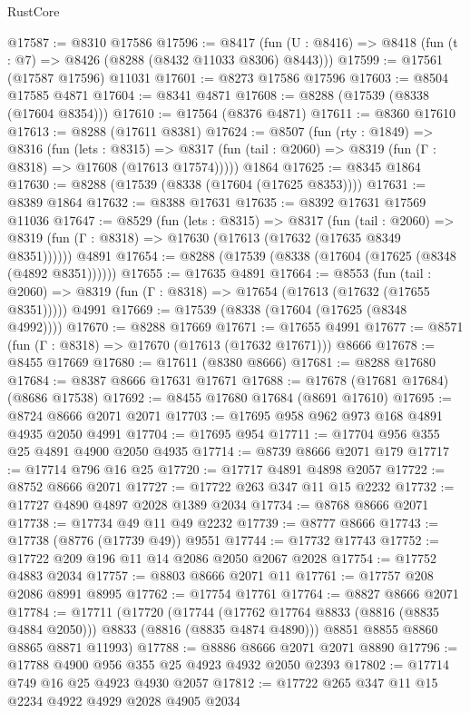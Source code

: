 \begin{lexlean}{RustCore}
\begin{coremodule}
@17587 := @8310 @17586
@17596 := @8417
    (fun (U : @8416) => @8418 (fun (t : @7) => @8426 (@8288 (@8432 @11033 @8306) @8443)))
@17599 := @17561 (@17587 @17596) @11031
@17601 := @8273 @17586 @17596
@17603 := @8504 @17585 @4871
@17604 := @8341 @4871
@17608 := @8288 (@17539 (@8338 (@17604 @8354)))
@17610 := @17564 (@8376 @4871)
@17611 := @8360 @17610
@17613 := @8288 (@17611 @8381)
@17624 := @8507
    (fun (rty : @1849) =>
    @8316
      (fun (lets : @8315) =>
      @8317 (fun (tail : @2060) => @8319 (fun (Γ : @8318) => @17608 (@17613 @17574)))))
    @1864
@17625 := @8345 @1864
@17630 := @8288 (@17539 (@8338 (@17604 (@17625 @8353))))
@17631 := @8389 @1864
@17632 := @8388 @17631
@17635 := @8392 @17631 @17569 @11036
@17647 := @8529
    (fun (lets : @8315) =>
    @8317
      (fun (tail : @2060) =>
      @8319 (fun (Γ : @8318) => @17630 (@17613 (@17632 (@17635 @8349 @8351))))))
    @4891
@17654 := @8288 (@17539 (@8338 (@17604 (@17625 (@8348 (@4892 @8351))))))
@17655 := @17635 @4891
@17664 := @8553
    (fun (tail : @2060) => @8319 (fun (Γ : @8318) => @17654 (@17613 (@17632 (@17655 @8351)))))
    @4991
@17669 := @17539 (@8338 (@17604 (@17625 (@8348 @4992))))
@17670 := @8288 @17669
@17671 := @17655 @4991
@17677 := @8571 (fun (Γ : @8318) => @17670 (@17613 (@17632 @17671))) @8666
@17678 := @8455 @17669
@17680 := @17611 (@8380 @8666)
@17681 := @8288 @17680
@17684 := @8387 @8666 @17631 @17671
@17688 := @17678 (@17681 @17684) (@8686 @17538)
@17692 := @8455 @17680 @17684 (@8691 @17610)
@17695 := @8724 @8666 @2071 @2071
@17703 := @17695 @958 @962 @973 @168 @4891 @4935 @2050 @4991
@17704 := @17695 @954
@17711 := @17704 @956 @355 @25 @4891 @4900 @2050 @4935
@17714 := @8739 @8666 @2071 @179
@17717 := @17714 @796 @16 @25
@17720 := @17717 @4891 @4898 @2057
@17722 := @8752 @8666 @2071
@17727 := @17722 @263 @347 @11 @15 @2232
@17732 := @17727 @4890 @4897 @2028 @1389 @2034
@17734 := @8768 @8666 @2071
@17738 := @17734 @49 @11 @49 @2232
@17739 := @8777 @8666
@17743 := @17738 (@8776 (@17739 @49)) @9551
@17744 := @17732 @17743
@17752 := @17722 @209 @196 @11 @14 @2086 @2050 @2067 @2028
@17754 := @17752 @4883 @2034
@17757 := @8803 @8666 @2071 @11
@17761 := @17757 @208 @2086 @8991 @8995
@17762 := @17754 @17761
@17764 := @8827 @8666 @2071
@17784 := @17711
    (@17720
      (@17744 (@17762 @17764 @8833 (@8816 (@8835 @4884 @2050))) @8833 (@8816 (@8835 @4874 @4890)))
      @8851
      @8855
      @8860
      @8865
      @8871
      @11993)
@17788 := @8886 @8666 @2071 @2071 @8890
@17796 := @17788 @4900 @956 @355 @25 @4923 @4932 @2050 @2393
@17802 := @17714 @749 @16 @25 @4923 @4930 @2057
@17812 := @17722 @265 @347 @11 @15 @2234 @4922 @4929 @2028 @4905 @2034

\end{coremodule}
\end{lexlean}
